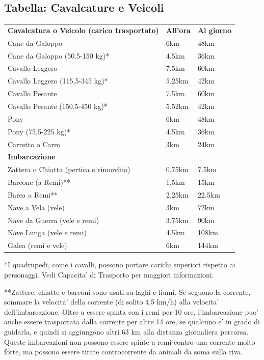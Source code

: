\documentclass[a4paper,11pt,twoside,openany]{book}
\begin{document}
{\subsection{Tabella: Cavalcature e Veicoli}

\medskip

\label{tabella-cavalcature-e-veicoli}

\begin{tabular}{lll}
\toprule
\textbf{Cavalcatura o Veicolo (carico trasportato)} & \textbf{All'ora} & \textbf{Al giorno}\tabularnewline
Cane da Galoppo &6km &48km\\
Cane da Galoppo (50.5-150 kg)* &4.5km& 36km\\
Cavallo Leggero& 7.5km &60km\\
Cavallo Leggero (115,5-345 kg)* &5.25km &42km\\
Cavallo Pesante &7.5km &60km\\
Cavallo Pesante (150.5-450 kg)* &5.52km& 42km\\
Pony &6km &48km\\
Pony (75,5-225 kg)* &4.5km &36km\\
Carretto o Carro &3km &24km\\
\textbf{Imbarcazione} &&\\
Zattera o Chiatta (pertica o rimorchio) & 0.75km &7.5km\\
Barcone (a Remi)** &1.5km &15km\\
Barca a Remi** &2.25km& 22.5km\\
Nave a Vela (vele) &3km &72km\\
Nave da Guerra (vele e remi) &3.75km& 90km\\
Nave Lunga (vele e remi) &4.5km& 108km\\
Galea (remi e vele) &6km& 144km\\
\end{tabular}

*I quadrupedi, come i cavalli, possono portare carichi superiori rispetto ai personaggi. Vedi Capacita' di Trasporto per maggiori informazioni.

**Zattere, chiatte e barconi sono usati su laghi e fiumi. Se seguono la corrente, sommare la velocita' della corrente (di solito 4,5 km/h) alla velocita' dell'imbarcazione. Oltre a essere spinta con i remi per 10 ore, l'imbarcazione puo' anche essere trasportata dalla corrente per altre 14 ore, se qualcuno e' in grado di guidarla, e quindi si aggiungono altri 63 km alla distanza giornaliera percorsa. Queste imbarcazioni non possono essere spinte a remi contro una corrente molto forte, ma possono essere tirate controcorrente da animali da soma sulla riva.

}
\end{document}

